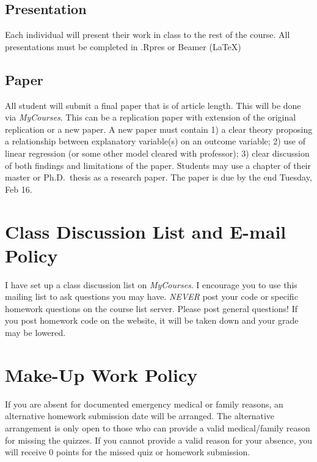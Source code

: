\documentclass[11pt,]{article}
\begin{document}
\subsection{Presentation}\label{presentation}

Each individual will present their work in class to the rest of the
course. All presentations must be completed in .Rpres or Beamer (LaTeX)

\subsection{Paper}\label{paper}

All student will submit a final paper that is of article length. This
will be done via \emph{MyCourses}. This can be a replication paper with
extension of the original replication or a new paper. A new paper must
contain 1) a clear theory proposing a relationship between explanatory
variable(s) on an outcome variable; 2) use of linear regression (or some
other model cleared with professor); 3) clear discussion of both
findings and limitations of the paper. Students may use a chapter of
their master or Ph.D.~thesis as a research paper. The paper is due by
the end Tuesday, Feb 16.

\section{Class Discussion List and E-mail
Policy}\label{class-discussion-list-and-e-mail-policy}

I have set up a class discussion list on \emph{MyCourses}. I encourage
you to use this mailing list to ask questions you may have. \emph{NEVER}
post your code or specific homework questions on the course list server.
Please post general questions! If you post homework code on the website,
it will be taken down and your grade may be lowered.

\section{Make-Up Work Policy}\label{make-up-work-policy}

If you are absent for documented emergency medical or family reasons, an
alternative homework submission date will be arranged. The alternative
arrangement is only open to those who can provide a valid medical/family
reason for missing the quizzes. If you cannot provide a valid reason for
your absence, you will receive 0 points for the missed quiz or homework
submission.
\end{document}
